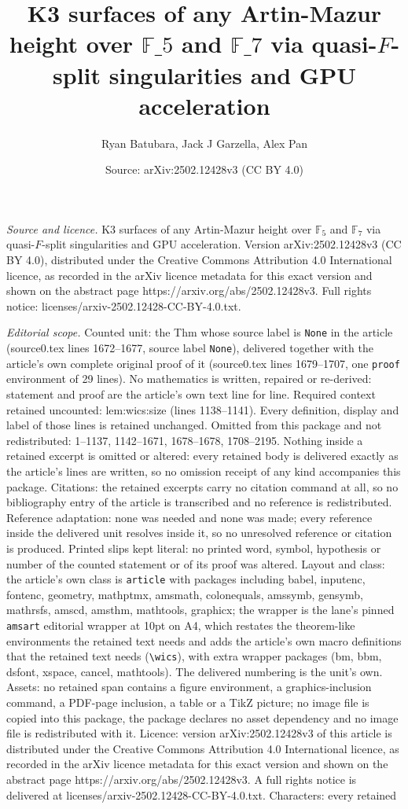 \documentclass[10pt,a4paper]{amsart}
\title[K3 surfaces of any Artin-Mazur height over $\mathbb{F}\_5$ an]{K3 surfaces of any Artin-Mazur height over $\mathbb{F}\_5$ and $\mathbb{F}\_7$ via quasi-$F$-split singularities and GPU acceleration}
\author{Ryan Batubara, Jack J Garzella, Alex Pan}
\date{Source: arXiv:2502.12428v3 (CC BY 4.0)}
\begin{document}
\maketitle

\noindent\emph{Source and licence.} K3 surfaces of any Artin-Mazur height over $\mathbb{F}_5$ and $\mathbb{F}_7$ via quasi-$F$-split singularities and GPU acceleration. Version arXiv:2502.12428v3 (CC BY 4.0), distributed under the Creative Commons Attribution 4.0 International licence, as recorded in the arXiv licence metadata for this exact version and shown on the abstract page https://arxiv.org/abs/2502.12428v3. Full rights notice: licenses/arxiv-2502.12428-CC-BY-4.0.txt.\par\smallskip

\noindent\textit{Editorial scope.} Counted unit: the Thm whose source label is \texttt{None} in the article (source0.tex lines 1672--1677, source label \texttt{None}), delivered together with the article's own complete original proof of it (source0.tex lines 1679--1707, one \texttt{proof} environment of 29 lines). No mathematics is written, repaired or re-derived: statement and proof are the article's own text line for line. Required context retained uncounted: lem:wics:size (lines 1138--1141). Every definition, display and label of those lines is retained unchanged. Omitted from this package and not redistributed: 1--1137, 1142--1671, 1678--1678, 1708--2195. Nothing inside a retained excerpt is omitted or altered: every retained body is delivered exactly as the article's lines are written, so no omission receipt of any kind accompanies this package. Citations: the retained excerpts carry no citation command at all, so no bibliography entry of the article is transcribed and no reference is redistributed. Reference adaptation: none was needed and none was made; every reference inside the delivered unit resolves inside it, so no unresolved reference or citation is produced. Printed slips kept literal: no printed word, symbol, hypothesis or number of the counted statement or of its proof was altered. Layout and class: the article's own class is \texttt{article} with packages including babel, inputenc, fontenc, geometry, mathptmx, amsmath, colonequals, amssymb, gensymb, mathrsfs, amscd, amsthm, mathtools, graphicx; the wrapper is the lane's pinned \texttt{amsart} editorial wrapper at 10pt on A4, which restates the theorem-like environments the retained text needs and adds the article's own macro definitions that the retained text needs (\texttt{\textbackslash wics}), with extra wrapper packages (bm, bbm, dsfont, xspace, cancel, mathtools). The delivered numbering is the unit's own. Assets: no retained span contains a figure environment, a graphics-inclusion command, a PDF-page inclusion, a table or a TikZ picture; no image file is copied into this package, the package declares no asset dependency and no image file is redistributed with it. Licence: version arXiv:2502.12428v3 of this article is distributed under the Creative Commons Attribution 4.0 International licence, as recorded in the arXiv licence metadata for this exact version and shown on the abstract page https://arxiv.org/abs/2502.12428v3. A full rights notice is delivered at licenses/arxiv-2502.12428-CC-BY-4.0.txt. Characters: every retained 
\end{document}
